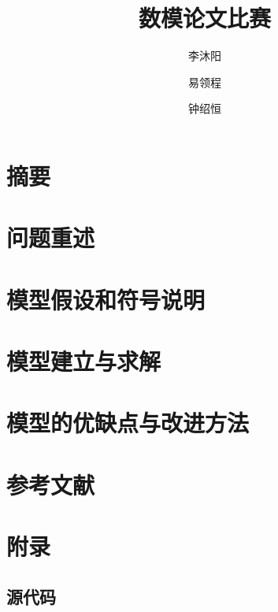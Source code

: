 \documentclass[UTF8]{ctexart}
\title{数模论文比赛}
\author{李沐阳 \and 易领程 \and 钟绍恒}
\begin{document}
\maketitle

\newpage

\tableofcontents


\newpage

\section{摘要}

\section{问题重述}

\section{模型假设和符号说明}

\section{模型建立与求解}

\section{模型的优缺点与改进方法}

\section{参考文献}

\appendix
\setcounter{secnumdepth}{-2} 
\section{附录}

\setcounter{secnumdepth}{3} 

\subsection{源代码}
\end{document}
